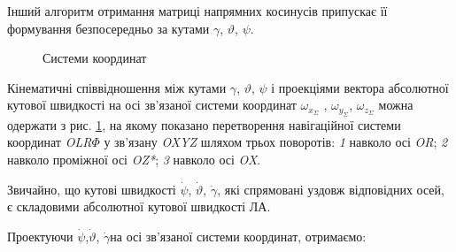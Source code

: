 Інший алгоритм отримання матриці напрямних косинусів припускає її  формування безпосередньо 
за кутами  $\gamma$, $\vartheta$, $\psi$. 
\begin{figure}[here]
\centering
\caption{Системи координат}
\label{fig:kinemat}
\end{figure} 
Кінематичні співвідношення між кутами $\gamma$, $\vartheta$, $\psi$ і проекціями вектора абсолютної кутової 
швидкості на осі зв'язаної системи координат $\omega_{x_{\Sigma } }$ , $\omega_{y_{\Sigma }}$, 
$\omega_{z_{\Sigma}} $ можна одержати з рис. \ref{fig:kinemat}, 
на якому показано перетворення навігаційної системи координат \textit{OLR$\Phi $ }у 
зв'язану \textit{OXYZ} шляхом трьох поворотів: \textit{1}   навколо осі \textit{OR}; \textit{2}  
навколо проміжної осі \textit{OZ*}; \textit{3}  навколо осі \textit{OX}.

 Звичайно, що кутові швидкості $\dot{\psi }$, $\dot{\vartheta }$, $\dot{\gamma }$, 
які спрямовані уздовж відповідних осей, є складовими абсолютної кутової швидкості 
ЛА.

 Проектуючи $\dot{\psi }$,$\dot{\vartheta }$, $\dot{\gamma }$на осі зв'язаної системи 
координат, отримаємо:

